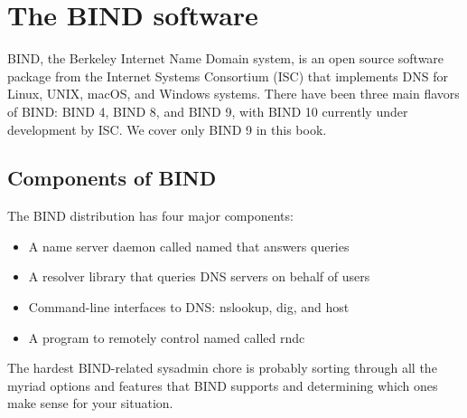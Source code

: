 \section{The BIND software}
\label{part0024_split_033.htmlux5cux23_idParaDest-156}


BIND, the
\protect\hypertarget{part0024_split_033.htmlux5cux23_idIndexMarker2112}{}{}\protect\hypertarget{part0024_split_033.htmlux5cux23_idIndexMarker2113}{}{}Berkeley
Internet Name Domain system, is an open source software package from the
\protect\hypertarget{part0024_split_033.htmlux5cux23_idIndexMarker2114}{}{}Internet
Systems Consortium (ISC) that implements DNS for Linux, UNIX, macOS, and
Windows systems. There have been three main flavors of BIND: BIND 4,
BIND 8, and BIND 9, with BIND 10 currently under development by ISC. We
cover only BIND 9 in this book.

\protect\hypertarget{part0024_split_034.html}{}{}

\hypertarget{part0024_split_034.htmlux5cux23_idContainer1069}{}
\hypertarget{part0024_split_034.htmlux5cux23calibre_pb_33}{%
\subsection[Components of
BIND]{\texorpdfstring{\protect\hypertarget{part0024_split_034.htmlux5cux23_idTextAnchor893}{}{}\protect\hypertarget{part0024_split_034.htmlux5cux23_idIndexMarker2115}{}{}\protect\hypertarget{part0024_split_034.htmlux5cux23_idTextAnchor894}{}{}Components
of
BIND}{Components of BIND}}\label{part0024_split_034.htmlux5cux23calibre_pb_33}}

The BIND distribution has four major components:

\begin{itemize}
\tightlist
\item
  A name server daemon called {named} that answers queries
\item
  A resolver library that queries DNS servers on behalf of users
\item
  Command-line interfaces to DNS: {nslookup}, {dig}, and {host}
\item
  A program to remotely control {named} called {rndc}
\end{itemize}

The hardest BIND-related sysadmin chore is probably sorting through all
the myriad options and features that BIND supports and determining which
ones make sense for your situation.

\protect\hypertarget{part0024_split_035.html}{}{}

